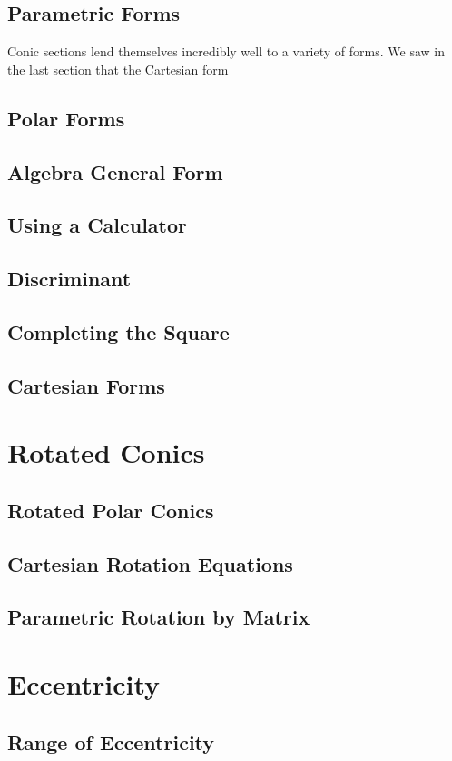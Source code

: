 \subsection{Parametric Forms}
Conic sections lend themselves incredibly well to a variety of forms.  We saw in the last section that the Cartesian form
\subsection{Polar Forms}
\subsection{Algebra General Form}
\subsection{Using a Calculator}
\subsection{Discriminant}
\subsection{Completing the Square}
\subsection{Cartesian Forms}

\newpage
\section{Rotated Conics}
\subsection{Rotated Polar Conics}
\subsection{Cartesian Rotation Equations}
\subsection{Parametric Rotation by Matrix}

\newpage
\section{Eccentricity}
\subsection{Range of Eccentricity}
